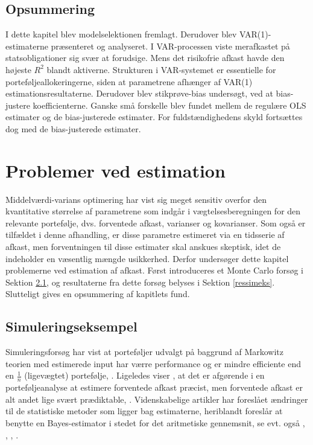 \documentclass[
  a4paper,
  oneside]{memoir}
\begin{document}
\hypertarget{opsundermodel}{%
\section{Opsummering}\label{opsundermodel}}

I dette kapitel blev modelselektionen fremlagt. Derudover blev VAR(1)-estimaterne præsenteret og analyseret. I VAR-processen viste merafkastet på statsobligationer sig svær at forudsige. Mens det risikofrie afkast havde den højeste \(R^2\) blandt aktiverne. Strukturen i VAR-systemet er essentielle for porteføljeallokeringerne, siden at parametrene afhænger af VAR(1) estimationsresultaterne. Derudover blev stikprøve-bias undersøgt, ved at bias-justere koefficienterne. Ganske små forskelle blev fundet mellem de regulære OLS estimater og de bias-justerede estimater. For fuldstændighedens skyld fortsættes dog med de bias-justerede estimater.

\hypertarget{problemervedest}{%
\chapter{Problemer ved estimation}\label{problemervedest}}

Middelværdi-varians optimering har vist sig meget sensitiv overfor den kvantitative størrelse af parametrene som indgår i vægtelsesberegningen for den relevante portefølje, dvs. forventede afkast, varianser og kovarianser. Som også er tilfældet i denne afhandling, er disse parametre estimeret via en tidsserie af afkast, men forventningen til disse estimater skal anskues skeptisk, idet de indeholder en væsentlig mængde usikkerhed. Derfor undersøger dette kapitel problemerne ved estimation af afkast. Først introduceres et Monte Carlo forsøg i Sektion \ref{simeks}, og resultaterne fra dette forsøg belyses i Sektion \ref{ressimeks}. Slutteligt gives en opsummering af kapitlets fund.

\hypertarget{simeks}{%
\section{Simuleringseksempel}\label{simeks}}

Simuleringsforsøg har vist at porteføljer udvalgt på baggrund af Markowitz teorien med estimerede input har værre performance og er mindre efficiente end en \(\tfrac{1}{n}\) (ligevægtet) portefølje, \citep{Frankfurter1971}. Ligeledes viser \citep{Chopra1993}, at det er afgørende i en porteføljeanalyse at estimere forventede afkast præcist, men forventede afkast er alt andet lige svært prædiktable, \citep{Merton1980}. Videnskabelige artikler har foreslået ændringer til de statistiske metoder som ligger bag estimaterne, heriblandt foreslår \citep{Jorion1986} at benytte en Bayes-estimator i stedet for det aritmetiske gennemsnit, se evt. også \citep{MacKinlay2000}, \citep{Garlappi2007}, \citep{Kan2007}, \citep{Tu2011}.
\end{document}
